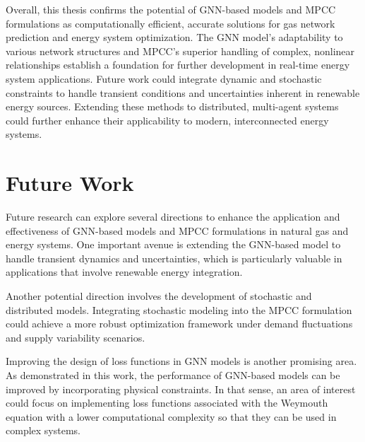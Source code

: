 Overall, this thesis confirms the potential of GNN-based models and MPCC formulations as computationally efficient, accurate solutions for gas network prediction and energy system optimization. The GNN model's adaptability to various network structures and MPCC's superior handling of complex, nonlinear relationships establish a foundation for further development in real-time energy system applications. Future work could integrate dynamic and stochastic constraints to handle transient conditions and uncertainties inherent in renewable energy sources. Extending these methods to distributed, multi-agent systems could further enhance their applicability to modern, interconnected energy systems.

\section{Future Work}

Future research can explore several directions to enhance the application and effectiveness of GNN-based models and MPCC formulations in natural gas and energy systems. One important avenue is extending the GNN-based model to handle transient dynamics and uncertainties, which is particularly valuable in applications that involve renewable energy integration. 

Another potential direction involves the development of stochastic and distributed models. Integrating stochastic modeling into the MPCC formulation could achieve a more robust optimization framework under demand fluctuations and supply variability scenarios. 

Improving the design of loss functions in GNN models is another promising area. As demonstrated in this work, the performance of GNN-based models can be improved by incorporating physical constraints.  In that sense, an area of interest could focus on implementing loss functions associated with the Weymouth equation with a lower computational complexity so that they can be used in complex systems. 





